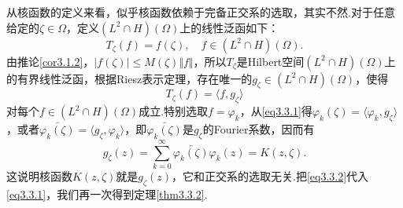从核函数的定义来看，似乎核函数依赖于完备正交系的选取，其实不然.对于任意给定的$\zeta\in\Omega$，定义$(L^2\cap H)(\Omega)$上的线性泛函如下：
\[T_\zeta(f)=f(\zeta),\quad f\in(L^2\cap H)(\Omega).\]
由推论\ref{cor3.1.2}，$|f(\zeta)|\le M(\zeta)\Vert f\Vert$，所以$T_\zeta$是Hilbert空间$(L^2\cap H)(\Omega)$上的有界线性泛函，根据Riesz表示定理，存在唯一的$g_\zeta \in(L^2\cap H)(\Omega)$，使得
\begin{equation}\label{eq3.3.1}
	T_\zeta (f)=\langle f,g_\zeta\rangle
\end{equation}
对每个$f\in(L^2\cap H)(\Omega)$成立.特别选取$f=\varphi_k$，从\eqref{eq3.3.1}得$\varphi_k(\zeta)=\langle\varphi_k,g_\zeta\rangle$，或者$\bar{\varphi_k(\zeta)}=\langle g_\zeta,\varphi_k\rangle$，即$\bar{\varphi_k(\zeta)}$是$g_\zeta$的Fourier系数，因而有
\begin{equation}\label{eq3.3.2}
	g_\zeta(z)=\sum_{k=0}^{\infty}\bar{\varphi_k(\zeta)}\varphi_k(z)=K(z,\zeta).
\end{equation}
这说明核函数$K(z,\zeta)$就是$g_\zeta(z)$，它和正交系的选取无关.把\eqref{eq3.3.2}代入\eqref{eq3.3.1}，我们再一次得到定理\ref{thm3.3.2}.

